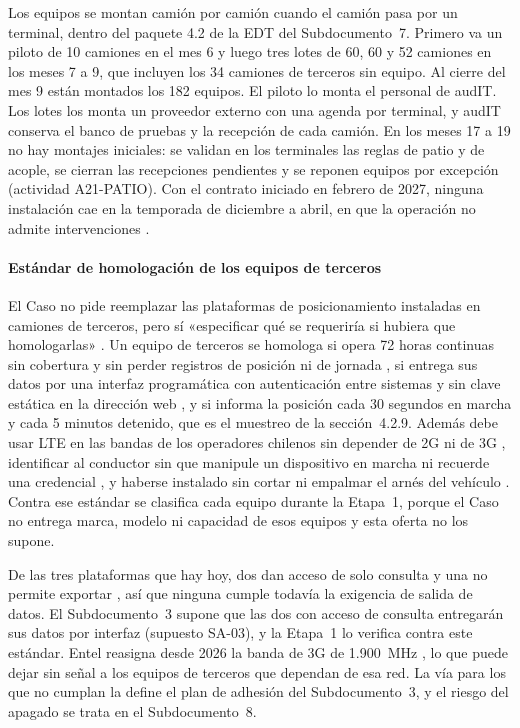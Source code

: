 Los equipos se montan camión por camión cuando el camión pasa por un terminal, dentro del paquete 4.2
de la EDT del Subdocumento~7. Primero va un piloto de 10 camiones en el mes 6 y luego tres lotes de 60,
60 y 52 camiones en los meses 7 a 9, que incluyen los 34 camiones de terceros sin equipo. Al cierre del
mes 9 están montados los 182 equipos. El piloto lo monta el personal de audIT. Los lotes los monta un
proveedor externo con una agenda por terminal, y audIT conserva el banco de pruebas y la recepción de
cada camión. En los meses 17 a 19 no hay montajes iniciales: se validan en los terminales las reglas de
patio y de acople, se cierran las recepciones pendientes y se reponen equipos por excepción
(actividad A21-PATIO). Con el contrato iniciado en febrero de 2027, ninguna instalación cae en la
temporada de diciembre a abril, en que la operación no admite intervenciones .

\paragraph{Estándar de homologación de los equipos de terceros} El Caso no pide reemplazar las
plataformas de posicionamiento instaladas en camiones de terceros, pero sí «especificar qué se
requeriría si hubiera que homologarlas» . Un equipo de terceros se homologa si
opera 72 horas continuas sin cobertura y sin perder registros de posición ni de jornada
, si entrega sus datos por una interfaz programática con autenticación entre
sistemas y sin clave estática en la dirección web , y si informa la posición cada
30 segundos en marcha y cada 5 minutos detenido, que es el muestreo de la sección~4.2.9. Además debe
usar LTE en las bandas de los operadores chilenos sin depender de 2G ni de 3G
\parencite{subtel_bandas,df_3g_entel}, identificar al conductor sin que manipule un dispositivo en marcha
ni recuerde una credencial , y haberse instalado sin cortar ni empalmar el arnés del
vehículo . Contra ese estándar se clasifica cada equipo durante la Etapa~1,
porque el Caso no entrega marca, modelo ni capacidad de esos equipos y esta oferta no los supone.

De las tres plataformas que hay hoy, dos dan acceso de solo consulta y una no permite exportar
, así que ninguna cumple todavía la exigencia de salida de datos. El
Subdocumento~3 supone que las dos con acceso de consulta entregarán sus datos por interfaz (supuesto
SA-03), y la Etapa~1 lo verifica contra este estándar. Entel reasigna desde 2026 la banda de 3G de
1.900~MHz \parencite{df_3g_entel}, lo que puede dejar sin señal a los equipos de terceros que dependan
de esa red. La vía para los que no cumplan la define el plan de adhesión del Subdocumento~3, y el riesgo
del apagado se trata en el Subdocumento~8.

